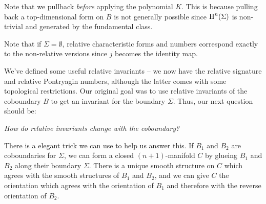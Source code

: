 \begin{remark}
	Note that we pullback \emph{before} applying the polynomial $K$. This is because pulling back a top-dimensional form on $B$ is not generally possible since $\operatorname{H}^{n}(\Sigma)$ is non-trivial and generated by the fundamental class.
\end{remark}

\begin{remark}
	Note that if $\Sigma=\emptyset$, relative characteristic forms and numbers correspond exactly to the non-relative versions since $j$ becomes the identity map.
\end{remark}

We've defined some useful relative invariants -- we now have the relative signature and relative Pontryagin numbers, although the latter comes with some topological restrictions. Our original goal was to use relative invariants of the coboundary $B$ to get an invariant for the boundary $\Sigma$. Thus, our next question should be:
\begin{center}
	\textsl{How do relative invariants change with the coboundary?}
\end{center}

There is a elegant trick we can use to help us answer this. If $B_1$ and $B_2$ are coboundaries for $\Sigma$, we can form a closed $(n+1)$-manifold $C$ by glueing $B_1$ and $B_2$ along their boundary $\Sigma$. There is a unique smooth structure on $C$ which agrees with the smooth structures of $B_1$ and $B_2$, and we can give $C$ the orientation which agrees with the orientation of $B_1$ and therefore with the reverse orientation of $B_2$.

